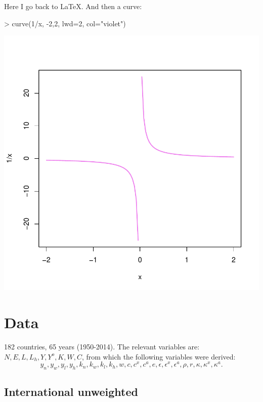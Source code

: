 \documentclass[pt=12]{article}
\begin{document}
Here I go back to \LaTeX.  And then a curve:

\begin{Schunk}
\begin{Sinput}
> curve(1/x, -2,2, lwd=2, col="violet")
\end{Sinput}
\end{Schunk}
\includegraphics{test-002}

\section{Data}

182 countries, 65 years (1950-2014).  The relevant variables are: $N, E, L, L_h, Y, Y^o, K, W, C$, from which the following variables were derived: 
\[
y_n, y_w, y_l, y_h, k_n, k_w, k_l, k_h, w, c, c^x, c^a, e, \epsilon, \epsilon^x, \epsilon^a, \rho, r, \kappa, \kappa^x, \kappa^a.
\]

\subsection{International unweighted}
\end{document}
